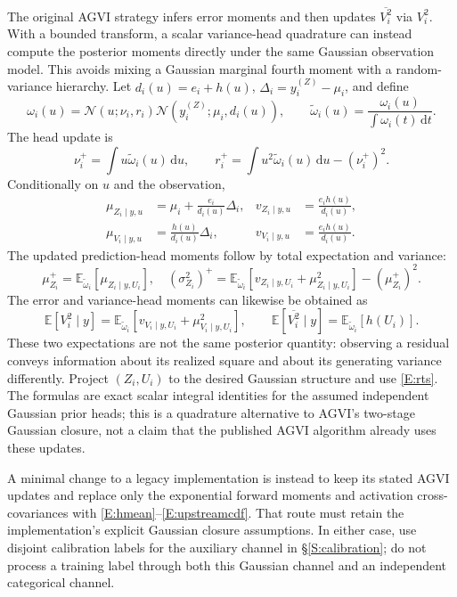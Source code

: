 \documentclass[letterpaper]{article}
\newcommand{\E}{\mathbb E}
\newcommand{\Normal}{\mathcal N}
\newcommand{\dd}{\,\mathrm d}
\newcommand{\vbari}{\overline{V_i^2}}
\newcommand{\given}{\mid}
\begin{document}
The original AGVI strategy infers error moments and then updates $\vbari$ via $V_i^2$. With a bounded transform, a scalar variance-head quadrature can instead compute the posterior moments directly under the same Gaussian observation model. This avoids mixing a Gaussian marginal fourth moment with a random-variance hierarchy. Let $d_i(u)=e_i+h(u)$, $\Delta_i=y_i^{(Z)}-\mu_i$, and define
\begin{equation}
\omega_i(u)=\Normal(u;\nu_i,r_i)\Normal(y_i^{(Z)};\mu_i,d_i(u)),\qquad
\widetilde\omega_i(u)=\frac{\omega_i(u)}{\int\omega_i(t)\dd t}.
\label{E:gaussweights}
\end{equation}
The head update is
\begin{equation}
\nu_i^+=\int u\widetilde\omega_i(u)\dd u,\qquad
r_i^+=\int u^2\widetilde\omega_i(u)\dd u-(\nu_i^+)^2.
\label{E:ugauss}
\end{equation}
Conditionally on $u$ and the observation,
\begin{align}
\mu_{Z_i\given y,u}&=\mu_i+\frac{e_i}{d_i(u)}\Delta_i,&
v_{Z_i\given y,u}&=\frac{e_ih(u)}{d_i(u)},\\
\mu_{V_i\given y,u}&=\frac{h(u)}{d_i(u)}\Delta_i,&
v_{V_i\given y,u}&=\frac{e_ih(u)}{d_i(u)}.
\end{align}
The updated prediction-head moments follow by total expectation and variance:
\begin{equation}
\mu_{Z_i}^+=\E_{\widetilde\omega_i}[\mu_{Z_i\given y,U_i}],\quad
(\sigma_{Z_i}^2)^+=\E_{\widetilde\omega_i}[v_{Z_i\given y,U_i}+\mu_{Z_i\given y,U_i}^2]-(\mu_{Z_i}^+)^2.
\label{E:zgauss}
\end{equation}
The error and variance-head moments can likewise be obtained as
\begin{equation}
\E[V_i^2\given y]=\E_{\widetilde\omega_i}[v_{V_i\given y,U_i}+\mu_{V_i\given y,U_i}^2],\qquad
\E[\vbari\given y]=\E_{\widetilde\omega_i}[h(U_i)].
\end{equation}
These two expectations are not the same posterior quantity: observing a residual conveys information about its realized square and about its generating variance differently. Project $(Z_i,U_i)$ to the desired Gaussian structure and use \eqref{E:rts}. The formulas are exact scalar integral identities for the assumed independent Gaussian prior heads; this is a quadrature alternative to AGVI's two-stage Gaussian closure, not a claim that the published AGVI algorithm already uses these updates.

A minimal change to a legacy implementation is instead to keep its stated AGVI updates and replace only the exponential forward moments and activation cross-covariances with \eqref{E:hmean}--\eqref{E:upstreamcdf}. That route must retain the implementation's explicit Gaussian closure assumptions. In either case, use disjoint calibration labels for the auxiliary channel in \S\ref{S:calibration}; do not process a training label through both this Gaussian channel and an independent categorical channel.
\end{document}
